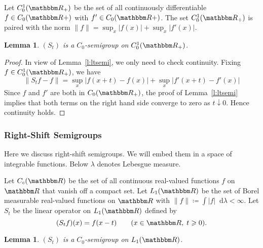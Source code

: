\documentclass[12pt, reqno]{amsart}
\renewcommand{\geq}{\geqslant}
\newcommand{\1}{\mathbbm 1}
\newcommand*\diff{\mathop{}\!\mathrm{d}}
\newcommand{\RR}{\mathbbm R}
\theoremstyle{plain}
\newtheorem{lemma}[theorem]{Lemma}
\theoremstyle{definition}
\begin{document}
Let $C_0^1(\RR_+)$ be the set of all continuously differentiable $f \in
C_0(\RR+)$ with $f' \in C_0(\RR+)$.  The set $C_0^1(\RR_+)$ is paired
with the norm $\|f\| = \sup_x |f(x)| + \sup_x |f'(x)|$.  

\begin{lemma}\label{l:ltsemi2}
    $(S_t)$ is a $C_0$-semigroup on $C_0^1(\RR_+)$.  
\end{lemma}

\begin{proof}
    In view of Lemma~\ref{l:ltsemi}, we only need to check continuity.
    Fixing $f \in C_0^1(\RR_+)$, we have
    \begin{equation*}
        \| S_t f - f \|
        = \sup_x | f(x + t)  - f(x) | + \sup_x | f'(x + t)  - f'(x) |
    \end{equation*}
    Since $f$ and $f'$ are both in $C_0(\RR_+)$, the proof of
    Lemma~\ref{l:ltsemi} implies that both terms on the right hand side
    converge to zero as $t \downarrow 0$.  Hence continuity holds.
\end{proof}

\subsubsection{Right-Shift Semigroups}\label{ss:rssemi}

Here we discuss right-shift semigroups.  We will embed them in a space of
integrable functions.  Below $\lambda$ denotes Lebesgue measure.

Let $C_c(\RR)$ be the set of all continuous real-valued functions $f$ on
$\RR$ that vanish off a compact set.  Let $L_1(\RR)$ be the set of 
Borel measurable real-valued functions on $\RR$ with $\| f \| \coloneq \int
|f| \diff \lambda < \infty$.  Let $S_t$ be the linear operator on $L_1(\RR)$
defined by 
%
\begin{equation*}
    (S_t f)(x) = f(x - t)
    \qquad (x \in \RR, \; t \geq 0).
\end{equation*}
%

\begin{lemma}\label{l:rtsemi}
    $(S_t)$ is a $C_0$-semigroup on $L_1(\RR)$.  
\end{lemma}
\end{document}
